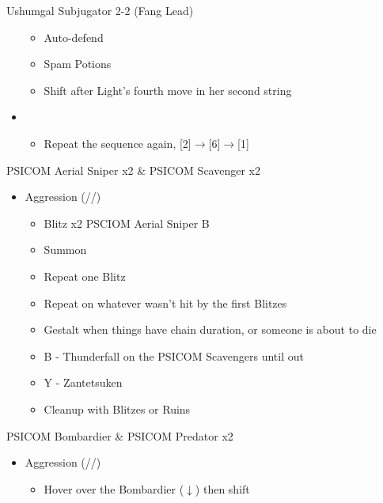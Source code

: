 \begin{multicols}{2}
\begin{battle}{Ushumgal Subjugator 2-2 (Fang Lead)}
\begin{itemize}
    \begin{itemize}
        \item Auto-defend
        \item Spam Potions
        \item Shift after Light's fourth move in her second string
    \end{itemize}
    \item \second
    \begin{itemize}
        \item Repeat the sequence again, [2]$\rightarrow$[6]$\rightarrow$[1]
    \end{itemize}
\end{itemize}
\end{battle}
\end{multicols}
\newpage
\begin{multicols}{2}
\renewcommand{\first}{[1] Aggression (\com/\com/\rav)}
\renewcommand{\second}{[2] Relentless Assault (\rav/\com/\rav)}
\begin{battle}{PSICOM Aerial Sniper x2 \& PSICOM Scavenger x2}
\begin{itemize}
    \item \first
    \begin{itemize}
        \item Blitz x2 PSCIOM Aerial Sniper B
        \item Summon
        \item Repeat one Blitz
        \item Repeat on whatever wasn't hit by the first Blitzes
        \item Gestalt when things have chain duration, or someone is about to die
        \item B - Thunderfall on the PSICOM Scavengers until out
        \item Y - Zantetsuken
        \item Cleanup with Blitzes or Ruins
    \end{itemize}
\end{itemize}
 
\end{battle}
\begin{battle}{PSICOM Bombardier \& PSICOM Predator x2}
\begin{itemize}
    \item \first
    \begin{itemize}
        \item Hover over the Bombardier ($\downarrow$) then shift

\end{itemize}
\end{itemize}
\end{battle}
\end{multicols}
